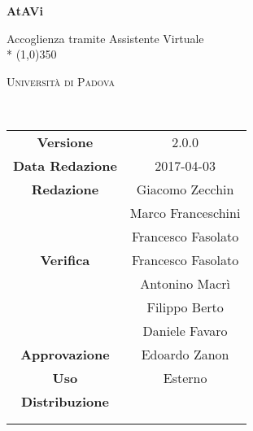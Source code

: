 \documentclass[a4paper,12pt]{article}
\author{}
\date{2017-04-03}
\begin{document}
	\begin{titlepage}
		\centering
		{\huge\bfseries AtAVi\par}
		Accoglienza tramite Assistente Virtuale \\*
		\line(1,0){350} \\
		{\scshape\LARGE Università di Padova \par}
		\vspace{1cm}
		{\scshape\Large {}\ \par}
		\logo
		\newpage
		\begin{tabular}{c|c}
			{\hfill \textbf{Versione}} 			& 2.0.0			\\ 
			{\hfill\textbf{Data Redazione}} 	& 2017-04-03 		\\ 
			{\hfill\textbf{Redazione}} 			& Giacomo Zecchin \\ & Marco Franceschini \\ & Francesco Fasolato\\ 
			{\hfill\textbf{Verifica}} 				& Francesco Fasolato \\ & Antonino Macrì \\ & Filippo Berto \\ & Daniele Favaro \\  
			{\hfill\textbf{Approvazione}} 		& Edoardo Zanon			\\
			{\hfill\textbf{Uso}} 						& Esterno 			\\
			{\hfill\textbf{Distribuzione}} 		& \vardanega \\ & \cardin \\ & \prop \\
		\end{tabular}
	\end{titlepage}
	
	\pagestyle{myfront}
	\newpage	
			

	\newpage
		\tableofcontents 	%
	\newpage
		\listoftables 		%
	\newpage	
		\listoffigures		%
	
	\label{LastFrontPage}
		\newpage
		\pagestyle{mymain}
			
		\newpage
			
		\newpage
			
		\newpage
			
		\newpage
			
		\newpage
			

	\label{LastPage}
\end{document}
